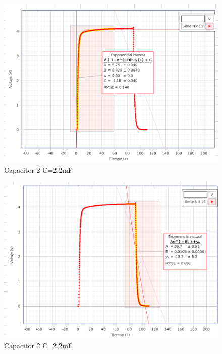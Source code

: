 \documentclass{article}
\begin{document}
\begin{figure}[H]
   \centering 
   \includegraphics[scale=0.5]{../imgs/r2.png}
   \caption{Capacitor 2 C=2.2mF}
   \label{Fig:3}
\end{figure}

\begin{figure}[H]
   \centering 
   \includegraphics[scale=0.5]{../imgs/r3.png}
   \caption{Capacitor 2 C=2.2mF}
   \label{Fig:4}
\end{figure}
\end{document}
